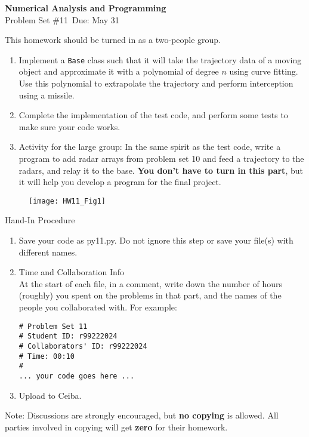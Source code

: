 \documentclass[12pt]{article}
\begin{document}
\begin{center}
\Large
\textbf{Numerical Analysis and Programming}\\
\large
Problem Set \#11\
Due: May 31
\end{center}
This homework should be turned in as  a two-people group.
\begin{enumerate}
\item Implement a \verb!Base! class such that it will take the trajectory data of a moving object and approximate it with a polynomial of degree $n$ using curve fitting. Use this polynomial to extrapolate the trajectory and perform interception using a missile. 
\item Complete the implementation of the test code, and perform some tests to make sure your code works. 
\item  Activity for the large group: In the same spirit as the test code, write a program to add radar arrays from problem set 10 and feed a trajectory  to the radars, and relay it to the base. \textbf{You don't have to turn in this part}, but it will help you develop a  program for the final project.  
\end{enumerate}

\begin{figure}[th]
\begin{center}
\texttt{[image: HW11\_Fig1]}
\end{center}
\end{figure}

Hand-In Procedure  
\begin{enumerate}
\item Save your code as py11.py.
 Do not ignore this step or save your file(s) with different names. 
\item Time and Collaboration Info \\
At the start of each file, in a comment, write down the number of hours (roughly) you spent on 
the problems in that part, and the names of the people you collaborated with. For example:
\begin{verbatim}
# Problem Set 11
# Student ID: r99222024
# Collaborators' ID: r99222024
# Time: 00:10
# 
... your code goes here ...
\end{verbatim}
\item Upload to Ceiba.
\end{enumerate}
Note: Discussions are strongly encouraged, but \textbf{no copying} is allowed. All parties involved in copying will get \textbf{zero} for their homework. 
\end{document}
